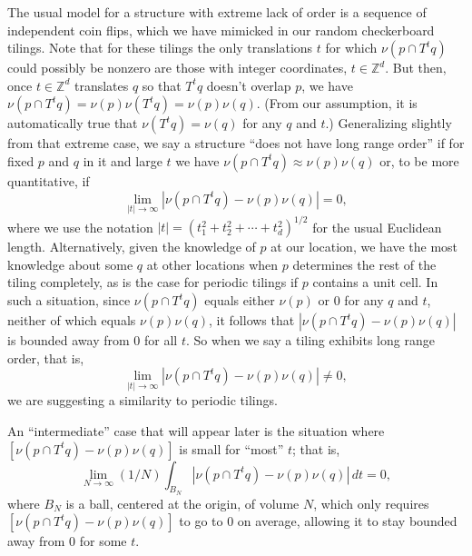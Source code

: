 \documentclass[reqno]{stml-l}
\theoremstyle{plain}
\theoremstyle{definition}
\numberwithin{equation}{chapter}
\begin{document}
The usual model for a structure with extreme lack of order is a sequence of independent coin flips, which we have mimicked in our random checkerboard tilings. Note that for these tilings the only translations $t$ for which $\nu(p\cap T^{t}q)$ could possibly be nonzero are those with integer coordinates, $t\in \mathbb{Z}^{d}$. But then, once $t\in \mathbb{Z}^{d}$ translates $q$ so that $T^{t}q$ doesn't overlap $p$, we have $\nu(p\cap T^{t}q)=\nu(p)\nu(T^{t}q)=\nu(p)\nu(q)$. (From our assumption, it is automatically true that $\nu(T^{t}q)=\nu(q)$ for any $q$ and $t$.) Generalizing slightly from that extreme case, we say a structure ``does not have long range order'' if for fixed $p$ and $q$ in it and large $t$ we have $\nu(p\cap T^{t}q)\approx\nu(p)\nu(q)$ or, to be more quantitative, if
\begin{equation}
\lim\limits_{|t|\rightarrow\infty}|\nu(p\cap T^{t}q)-\nu(p)\nu(q)|=0,\label{ch01:eqn1.1}
\end{equation}
where we use the notation $|t|=(t_{1}^{2}+t_{2}^{2}+\cdots+t_{d}^{2})^{1/2}$ for the usual Euclidean length. Alternatively, given the knowledge of $p$ at our location, we have the most knowledge about some $q$ at other locations when $p$ determines the rest of the tiling completely, as is the case for periodic tilings if $p$ contains a unit cell. In such a situation, since $\nu(p\cap T^{t}q)$ equals either $\nu(p)$ or $0$ for any $q$ and $t$, neither of which equals $\nu(p)\nu(q)$, it follows that $|\nu(p\cap T^{t}q)-\nu(p)\nu(q)|$ is bounded away from $0$ for all $t$. So when we say a tiling exhibits long range order, that is,
\begin{equation}
\lim\limits_{|t|\rightarrow\infty
}|\nu(p\cap T^{t}q)-\nu(p)\nu(q)|\neq 0,\label{ch01:eqn1.2}
\end{equation}
we are suggesting a similarity to periodic tilings.

An ``intermediate'' case that will appear later is the situation where $[\nu(p\cap T^{t}q)-\nu(p)\nu(q)]$ is small for ``most'' $t$; that is,
\begin{equation}
\lim\limits_{N\rightarrow\infty}(1/N)\int_{B_{N}}|\nu(p\cap T^{t}q)-\nu(p)\nu(q)|\,dt=0,\label{ch01:eqn1.3}
\end{equation}
where $B_{N}$ is a ball, centered at the origin, of volume $N$, which only requires $[\nu(p\cap T^{t}q)-\nu(p)\nu(q)]$ to go to 0 on average, allowing it to stay bounded away from 0 for some $t$.
\end{document}

